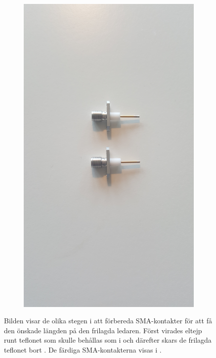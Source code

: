 \documentclass[main.tex]{subfiles}
\begin{document}
\begin{figure}[h]
\begin{subfigure}{0.329\textwidth}
        \includegraphics[angle=-90,trim=1300 100 1700 100,clip,width=0.97\linewidth]{figure/Filterbilder/e_sma_skalning.jpg} 
        \caption{}
        \label{fig:e_SMA_skalning}
    \end{subfigure}
    
    
    \caption{Bilden visar de olika stegen i att förbereda SMA-kontakter för att få den önskade längden på den frilagda ledaren. Först virades eltejp runt teflonet som skulle behållas som i  och därefter skars de frilagda teflonet bort . De färdiga SMA-kontakterna visas i .}
    \label{fig:SMA_skalning}
\end{figure}
\end{document}
